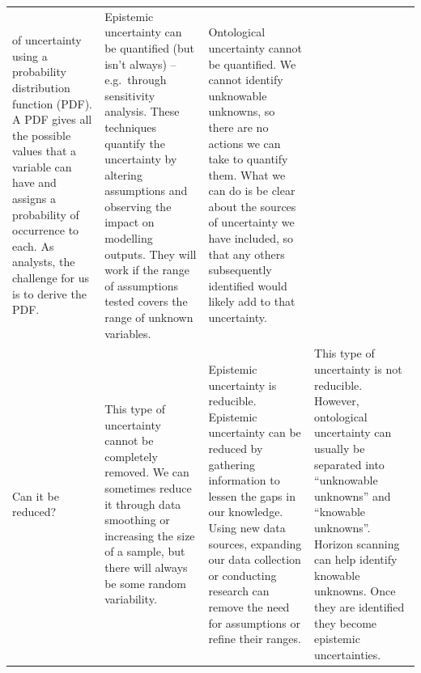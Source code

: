 \documentclass[]{book}
\begin{document}
\begin{longtable}[]{@{}llll@{}}
\begin{minipage}[t]{0.22\columnwidth}
of uncertainty using a probability distribution function (PDF). A PDF
gives all the possible values that a variable can have and assigns a
probability of occurrence to each. As analysts, the challenge for us is
to derive the PDF.\strut
\end{minipage} & \begin{minipage}[t]{0.25\columnwidth}\raggedright\strut
Epistemic uncertainty can be quantified (but isn't always) --
e.g.~through sensitivity analysis. These techniques quantify the
uncertainty by altering assumptions and observing the impact on
modelling outputs. They will work if the range of assumptions tested
covers the range of unknown variables.\strut
\end{minipage} & \begin{minipage}[t]{0.28\columnwidth}\raggedright\strut
Ontological uncertainty cannot be quantified. We cannot identify
unknowable unknowns, so there are no actions we can take to quantify
them. What we can do is be clear about the sources of uncertainty we
have included, so that any others subsequently identified would likely
add to that uncertainty.\strut
\end{minipage}\tabularnewline
\begin{minipage}[t]{0.14\columnwidth}\raggedright\strut
 Can it be reduced? \strut
\end{minipage} & \begin{minipage}[t]{0.22\columnwidth}\raggedright\strut
This type of uncertainty cannot be completely removed. We can sometimes
reduce it through data smoothing or increasing the size of a sample, but
there will always be some random variability.\strut
\end{minipage} & \begin{minipage}[t]{0.25\columnwidth}\raggedright\strut
Epistemic uncertainty is reducible. Epistemic uncertainty can be reduced
by gathering information to lessen the gaps in our knowledge. Using new
data sources, expanding our data collection or conducting research can
remove the need for assumptions or refine their ranges.\strut
\end{minipage} & \begin{minipage}[t]{0.28\columnwidth}\raggedright\strut
This type of uncertainty is not reducible. However, ontological
uncertainty can usually be separated into ``unknowable unknowns'' and
``knowable unknowns''. Horizon scanning can help identify knowable
unknowns. Once they are identified they become epistemic
uncertainties.\strut
\end{minipage}\tabularnewline

\end{longtable}
\end{document}
